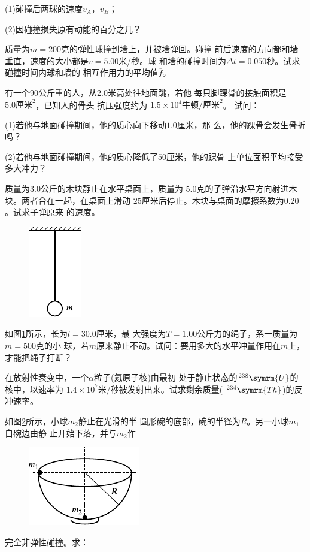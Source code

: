 \begin{exercises}
\clearpage
(1)碰撞后两球的速度$ v _ { A } $，$ v _ { B } $；

(2)因碰撞损失原有动能的百分之几？

\exercise 质量为$ m = 200 $克的弹性球撞到墙上，并被墙弹回。碰撞
前后速度的方向都和墙垂直，速度的大小都是$ v = 5.00 $米/秒。球
和墙的碰撞时间为$ \Delta t = 0.050 $秒。试求碰撞时间内球和墙的
相互作用力的平均值$ \overline { f } $。

\exercise 有一个$ 90 $公斤重的人，从$ 2.0 $米高处往地面跳，若他
每只脚踝骨的接触面积是$ 5.0 \text {厘米} ^ { 2 } $，已知人的骨头
抗压强度约为
$ 1.5 \times 10 ^ { 4 } \text {牛顿} / \text {厘米} ^ { 2 } $。
试问：

(1)若他与地面碰撞期间，他的质心向下移动$ 1.0 $厘米，那
么，他的踝骨会发生骨折吗？

(2)若他与地面碰撞期间，他的质心降低了$ 50 $厘米，他的踝骨
上单位面积平均接受多大冲力？

\exercise 质量为$ 3.0 $公斤的木块静止在水平桌面上，质量为
$ 5.0 $克的子弹沿水平方向射进木块。两者合在一起，在桌面上滑动
$ 25 $厘米后停止。木块与桌面的摩擦系数为$ 0.20 $。试求子弹原来
的速度。

\begin{figure}
  \vspace{-1.56em}
  \centering
  \includegraphics{figure/fig08.13}
  \caption{}
  \label{fig:08.13}
\end{figure}
\exercise 如图\ref{fig:08.13}所示，长为$ l = 30.0 $厘米，最
大强度为$ T = 1.00 $公斤力的绳子，系一质量为$ m = 500 $克的小
球，若$ m $原来静止不动。试问：要用多大的水平冲量作用在$ m $上，
才能把绳子打断？

\exercise 在放射性衰变中，一个$ \alpha $粒子(氦原子核)由最初
处于静止状态的$ ^{ 238 } \symrm{U} $的核中，以速率为
$ 1.4 \times 10 ^ { 7 }$米/秒被发射出来。试求剩余质量(
$ ^{ 234 } \symrm{Th} $)的反冲速率。

\exercise 如图\ref{fig:08.14}所示，小球$ m _ { 2 } $静止在光滑的半
圆形碗的底部，碗的半径为$ R $。另一小球$ m _ { 1 } $自碗边由静
止开始下落，并与$ m _ { 2 } $作
\begin{figure}
  \centering
  \includegraphics{figure/fig08.14}
  \caption{}
  \label{fig:08.14}
\end{figure}
完全非弹性碰撞。求：


\end{exercises}
